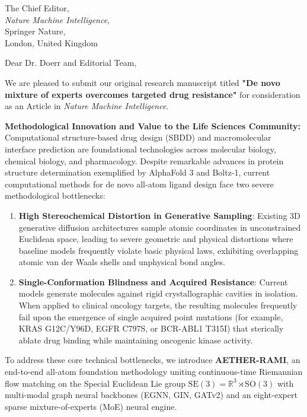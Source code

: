 \documentclass[11pt]{letter}
\begin{document}
\begin{letter}{%
    The Chief Editor,\\
    \textit{Nature Machine Intelligence},\\
    Springer Nature,\\
    London, United Kingdom
}

\opening{Dear Dr. Doerr and Editorial Team,}

We are pleased to submit our original research manuscript titled \textbf{"De novo mixture of experts overcomes targeted drug resistance"} for consideration as an Article in \textit{Nature Machine Intelligence}.

\textbf{Methodological Innovation and Value to the Life Sciences Community:}\\
Computational structure-based drug design (SBDD) and macromolecular interface prediction are foundational technologies across molecular biology, chemical biology, and pharmacology. Despite remarkable advances in protein structure determination exemplified by AlphaFold 3 and Boltz-1, current computational methods for de novo all-atom ligand design face two severe methodological bottlenecks:
\begin{enumerate}
    \item \textbf{High Stereochemical Distortion in Generative Sampling}: Existing 3D generative diffusion architectures sample atomic coordinates in unconstrained Euclidean space, leading to severe geometric and physical distortions where baseline models frequently violate basic physical laws, exhibiting overlapping atomic van der Waals shells and unphysical bond angles.
    \item \textbf{Single-Conformation Blindness and Acquired Resistance}: Current models generate molecules against rigid crystallographic cavities in isolation. When applied to clinical oncology targets, the resulting molecules frequently fail upon the emergence of single acquired point mutations (for example, KRAS G12C/Y96D, EGFR C797S, or BCR-ABL1 T315I) that sterically ablate drug binding while maintaining oncogenic kinase activity.
\end{enumerate}

To address these core technical bottlenecks, we introduce \textbf{AETHER-RAMI}, an end-to-end all-atom foundation methodology uniting continuous-time Riemannian flow matching on the Special Euclidean Lie group $\mathrm{SE}(3) = \mathbb{R}^3 \rtimes \mathrm{SO}(3)$ with multi-modal graph neural backbones (EGNN, GIN, GATv2) and an eight-expert sparse mixture-of-experts (MoE) neural engine.


\end{letter}
\end{document}
